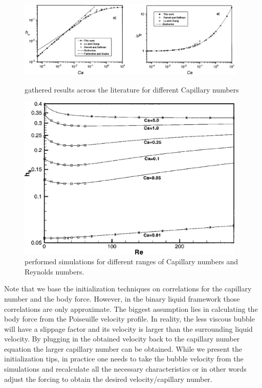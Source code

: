 \documentclass{article}
\begin{document}
\begin{figure}
\includegraphics[width=0.97\textwidth]{Figures/giavedoni_planar.eps}
\caption{\citet{giavedoni-numerical} gathered results across the
literature for different Capillary numbers \label{fig:giavedoni:planar}}
\includegraphics[width=0.97\textwidth]{Figures/heil-planar.eps}
\caption{\citet{heil-bretherton} performed simulations for different ranges of
Capillary numbers and Reynolds numbers. \label{fig:heil:planar}}
\end{figure}
Note that we base the initialization techniques on correlations for the
capillary number and the body force. However, in the binary liquid framework
those correlations are only approximate. The biggest assumption lies
in calculating the body force from the Poiseuille velocity profile.
In reality, the less viscous bubble will have a slippage
factor and its velocity is larger than the surrounding liquid velocity. By
plugging in the obtained velocity back to the capillary number equation the
larger capillary number can be obtained. While we present the initialization
tips, in practice one needs to take the bubble velocity from the simulations and
recalculate all the necessary characteristics or in other words adjust the
forcing to obtain the desired velocity/capillary number.
\end{document}
